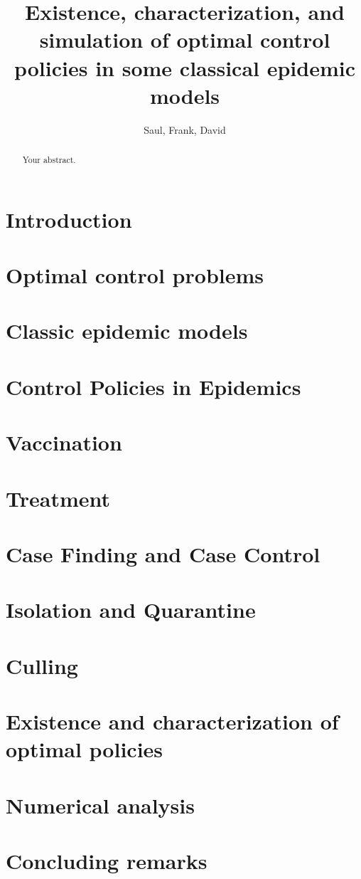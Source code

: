 \documentclass[a4paper]{amsart}
\title[%
	Existence, characterization and simulation of OCP for some epidemic 
	Models%
	]{
	Existence, characterization, and simulation
	of optimal control policies in some classical epidemic models
}
\author{Saul, Frank, David}
\begin{document}
	\maketitle
  \begin{abstract}
  	Your abstract.
  \end{abstract}
%
%
  \section{Introduction}
    
  \section{Optimal control problems}
    
  \section{Classic epidemic models}
  \section{Control Policies in Epidemics}
    
  \section{Vaccination}
    
  \section{Treatment}
    
  \section{Case Finding and Case Control}
    
  \section{Isolation and Quarantine}
    
  \section{Culling}
    
  \section{Existence and characterization of optimal policies}
  \section{Numerical analysis}
    
  \section{Concluding remarks}
%
%
  
  
\end{document}

